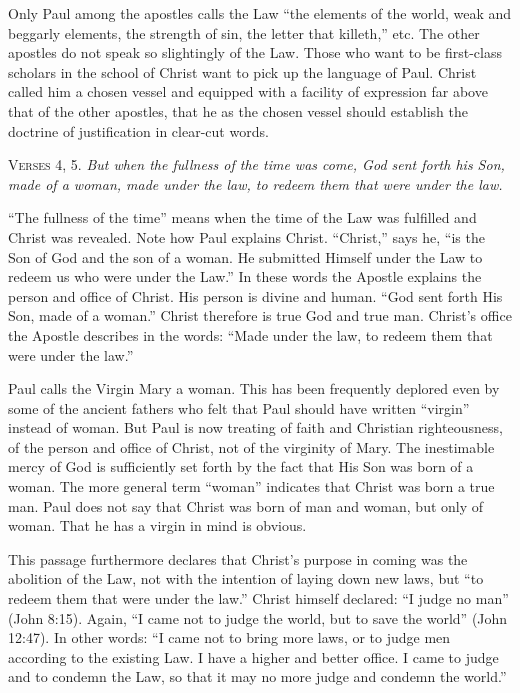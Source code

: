 Only Paul among the apostles calls the Law “the elements of the world, weak and beggarly elements, the strength of sin, the letter that killeth,” etc. The other apostles do not speak so slightingly of the Law. Those who want to be first-class scholars in the school of Christ want to pick up the language of Paul. Christ called him a chosen vessel and equipped with a facility of expression far above that of the other apostles, that he as the chosen vessel should establish the doctrine of justification in clear-cut words.

\textsc{Verses} 4, 5. \emph{But when the fullness of the time was come, God sent forth his Son, made of a woman, made under the law, to redeem them that were under the law.}

“The fullness of the time” means when the time of the Law was fulfilled and Christ was revealed. Note how Paul explains Christ. “Christ,” says he, “is the Son of God and the son of a woman. He submitted Himself under the Law to redeem us who were under the Law.” In these words the Apostle explains the person and office of Christ. His person is divine and human. “God sent forth His Son, made of a woman.” Christ therefore is true God and true man. Christ’s office the Apostle describes in the words: “Made under the law, to redeem them that were under the law.”

Paul calls the Virgin Mary a woman. This has been frequently deplored even by some of the ancient fathers who felt that Paul should have written “virgin” instead of woman. But Paul is now treating of faith and Christian righteousness, of the person and office of Christ, not of the virginity of Mary. The inestimable mercy of God is sufficiently set forth by the fact that His Son was born of a woman. The more general term “woman” indicates that Christ was born a true man. Paul does not say that Christ was born of man and woman, but only of woman. That he has a virgin in mind is obvious.

This passage furthermore declares that Christ’s purpose in coming was the abolition of the Law, not with the intention of laying down new laws, but “to redeem them that were under the law.” Christ himself declared: “I judge no man” (John 8:15). Again, “I came not to judge the world, but to save the world” (John 12:47). In other words: “I came not to bring more laws, or to judge men according to the existing Law. I have a higher and better office. I came to judge and to condemn the Law, so that it may no more judge and condemn the world.”

